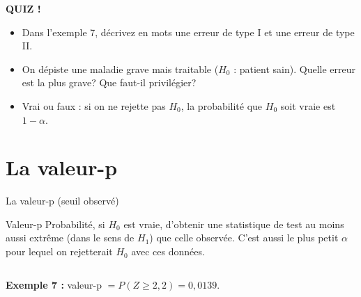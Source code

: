 \documentclass{BeamerTemplate}
\def\dnorm{exp(-x^2/2)/sqrt(2*pi)}
\begin{document}
\begin{frame}[plain,t]
  \centerline{\LARGE\bfseries\alert{QUIZ !}}

  \medskip
  \begin{itemize}\itemsep 1.2cm
    \item Dans l'exemple 7, décrivez en mots une erreur de type I et une erreur de type II.
    \item<2-> On dépiste une maladie grave mais traitable ($H_0$ : patient sain). Quelle erreur est la plus grave? Que faut-il privilégier?
    \item<3-> Vrai ou faux : si on ne rejette pas $H_0$, la probabilité que $H_0$ soit vraie est $1 - \alpha$.
  \end{itemize}
\end{frame}

\section{La valeur-p}

\begin{frame}[t]{La valeur-p (seuil observé)}
  \begin{Boite}{Valeur-p}
    \small
    Probabilité, \alert{si $H_0$ est vraie}, d'obtenir une statistique de test \alert{au moins aussi extrême} (dans le sens de $H_1$) que celle observée.
    C'est aussi le plus petit $\alpha$ pour lequel on rejetterait $H_0$ avec ces données.
  \end{Boite}

  \begin{columns}[T]

      \small
      \textbf{Exemple 7 :}
      valeur-p $= P(Z \ge 2{,}2) = 0{,}0139$.

      \medskip
  \end{columns}
\end{frame}
\end{document}
